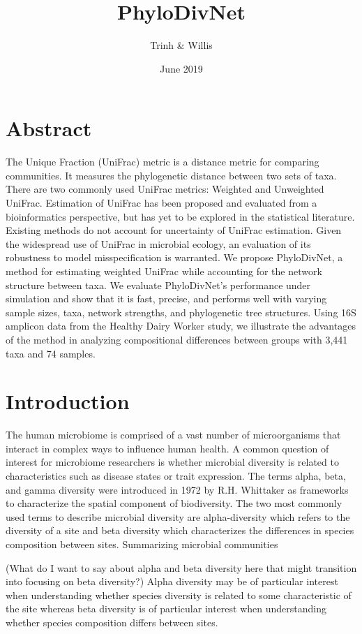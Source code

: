 \documentclass{article}
\title{PhyloDivNet}
\author{Trinh & Willis}
\date{June 2019}
\begin{document}
\maketitle
\section{Abstract}
The Unique Fraction (UniFrac) metric is a distance metric for comparing communities. It measures the phylogenetic distance between two sets of taxa. There are two commonly used UniFrac metrics: Weighted and Unweighted UniFrac. Estimation of UniFrac has been proposed and evaluated from a bioinformatics perspective, but has yet to be explored in the statistical literature. Existing methods do not account for uncertainty of UniFrac estimation. Given the widespread use of UniFrac in microbial ecology, an evaluation of its robustness to model misspecification is warranted. We propose PhyloDivNet, a method for estimating weighted UniFrac while accounting for the network structure between taxa. We evaluate PhyloDivNet’s performance under simulation and show that it is fast, precise, and performs well with varying sample sizes, taxa, network strengths, and phylogenetic tree structures. Using 16S amplicon data from the Healthy Dairy Worker study, we illustrate the advantages of the method in analyzing compositional differences between groups with 3,441 taxa and 74 samples.  
\section{Introduction}
The human microbiome is comprised of a vast number of microorganisms that interact in complex ways to influence human health. A common question of interest for microbiome researchers is whether microbial diversity is related to characteristics such as disease states or trait expression. The terms alpha, beta, and gamma diversity were introduced in 1972 by R.H. Whittaker as frameworks to characterize the spatial component of biodiversity. The two most commonly used terms to describe microbial diversity are alpha-diversity which refers to the diversity of a site and beta diversity which characterizes the differences in species composition between sites. Summarizing microbial communities

(What do I want to say about alpha and beta diversity here that might transition into focusing on beta diversity?)
Alpha diversity may be of particular interest when understanding whether species diversity is related to some characteristic of the site whereas beta diversity is of particular interest when understanding whether species composition differs between sites.
\end{document}
